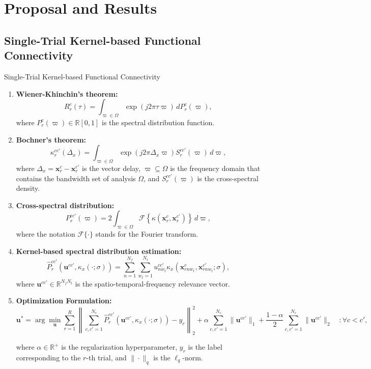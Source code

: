 \documentclass[aspectratio=169]{beamer}
\begin{document}
\section{Proposal and Results}

\subsection{Single-Trial Kernel-based Functional Connectivity}

\begin{frame}[allowframebreaks]{Single-Trial Kernel-based Functional Connectivity}
    \begin{enumerate}
        \item \textbf{Wiener-Khinchin's theorem:} 
        \[
        R^{c}_{r}(\tau) = \int_{\varpi \in \Omega} \exp(j2\pi \tau \varpi) \, dP^{c}_{r}(\varpi),
        \]
        where $P^{c}_{r}(\varpi) \in \mathbb{R}[0,1]$ is the spectral distribution function.
        
        \item \textbf{Bochner's theorem:} 
        \[
        \kappa^{cc'}_{r}(\Delta_{x}) = \int_{\varpi \in \Omega} \exp(j2\pi \Delta_{x} \varpi) S^{cc'}_{r}(\varpi) \, d\varpi,
        \]
        where $\Delta_{x} = \mathbf{x}^{c}_{r} - \mathbf{x}^{c'}_{r}$ is the vector delay, $\varpi \subseteq \varOmega$ is the frequency domain that contains the bandwidth set of analysis $\varOmega$, and $S^{cc'}_{r}(\varpi)$ is the cross-spectral density.

        \item \textbf{Cross-spectral distribution:} 
        \[
        P^{cc'}_{r}(\varpi) = 2 \int_{\varpi \in \varOmega} \mathscr{F}\left\{\kappa(\mathbf{x}^{c}_{r}, \mathbf{x}^{c'}_{r}) \right\} \, d\varpi,
        \]
        where the notation $\mathscr{F}\{\cdot\}$ stands for the Fourier transform.

        \item \textbf{Kernel-based spectral distribution estimation:}
        \[
        \hat{P}^{cc'}_{r}(\mathbf{u}^{cc'},\kappa_x\left(\cdot;\sigma\right)) = \sum_{n=1}^{N_f}\sum_{w_t=1}^{N_t} u_{nw_t}^{cc'}\kappa_x\left(\mathbf{x}^{c}_{rnw_t},\mathbf{x}^{c'}_{rnw_t};\sigma\right),
        \]
        where $\mathbf{u}^{cc'} \in \mathbb{R}^{N_f N_t}$ is the spatio-temporal-frequency relevance vector.

        \item \textbf{Optimization Formulation:}
        {\scriptsize
        \[
        \mathbf{u}^* = \arg \min_{\mathbf{u}} \sum_{r=1}^{R} \left\|\sum_{c,c'=1}^{N_c}\hat{P}^{cc'}_{r}(\mathbf{u}^{cc'},\kappa_x(\cdot;\sigma))-y_r\right\|^2_2 + \alpha \sum_{c,c'=1}^{N_c}\|\mathbf{u}^{cc'}\|_1 + \frac{1-\alpha}{2} \sum_{c,c'=1}^{N_c}\|\mathbf{u}^{cc'}\|_2 \quad :  \forall c < c',
        \]}

        where $\alpha \in \mathbb{R}^+$ is the regularization hyperparameter, $y_r$ is the label corresponding to the $r$-th trial, and $\| \cdot \|_q$ is the $\ell_q$-norm.
    \end{enumerate}
\end{frame}
\end{document}
